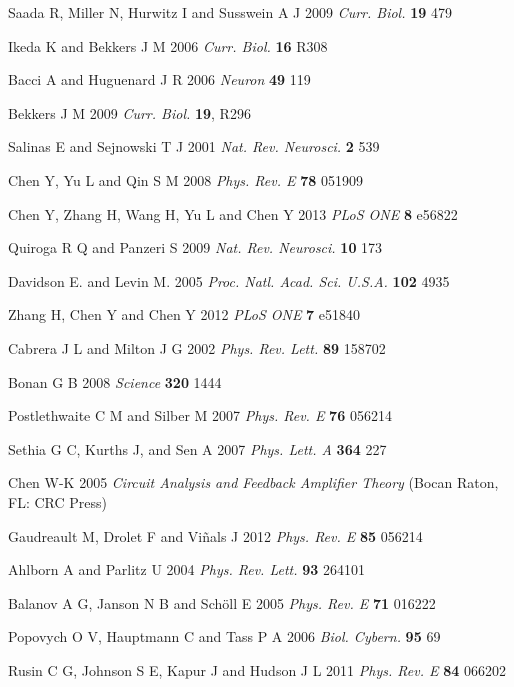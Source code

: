 \documentclass[twocolumn,showpacs,preprintnumbers,amsmath,amssymb,pre,superscriptaddress]{revtex4-1}
\begin{document}
\begin{CJK}{UTF8}{gbsn}
\begin{thebibliography}{999}
 Saada R, Miller N, Hurwitz I and Susswein A J 2009 \textit{Curr. Biol. } \textbf{19}  479 

 Ikeda K and Bekkers J M 2006 \textit{Curr. Biol. } \textbf{16} R308

 Bacci A and Huguenard J R 2006 \textit{Neuron} \textbf{49} 119

 Bekkers J M 2009 \textit{Curr. Biol.} \textbf{19}, R296

 Salinas E and Sejnowski T J 2001 \textit{Nat. Rev. Neurosci.} \textbf{2} 539

Chen Y, Yu L and Qin S M 2008 \textit{Phys. Rev. E} \textbf{78} 051909

 Chen Y, Zhang H, Wang H, Yu L and Chen Y 2013 \textit{PLoS ONE} \textbf{8} e56822

 Quiroga R  Q  and Panzeri S 2009 \textit{Nat. Rev. Neurosci.} \textbf{10} 173

 Davidson E. and Levin M. 2005 \textit{Proc. Natl. Acad. Sci. U.S.A.} \textbf{102} 4935

 Zhang H, Chen Y and Chen Y 2012 \textit{PLoS ONE} \textbf{7} e51840

 Cabrera J L and Milton J G 2002 \textit{Phys. Rev. Lett.} \textbf{89} 158702

 Bonan G B 2008 \textit{Science} \textbf{320} 1444

 Postlethwaite C M and Silber M 2007 \textit{Phys. Rev. E} \textbf{76} 056214

 Sethia G C, Kurths J, and Sen A 2007 \textit{Phys. Lett. A} \textbf{364} 227

 Chen W-K 2005 \textit{Circuit Analysis and Feedback Amplifier Theory} (Bocan Raton, FL: CRC Press)

 Gaudreault M, Drolet F and Viñals J 2012 \textit{Phys. Rev. E} \textbf{85} 056214

 Ahlborn A and Parlitz U 2004 \textit{Phys. Rev. Lett.} \textbf{93} 264101

 Balanov A G, Janson N B and Sch\"{o}ll E 2005 \textit{Phys. Rev. E} \textbf{71} 016222

 Popovych O V, Hauptmann C and Tass P A 2006 \textit{Biol. Cybern.} \textbf{95} 69


 Rusin C G, Johnson S E, Kapur J and Hudson J L 2011 \textit{Phys. Rev. E} \textbf{84} 066202



\end{thebibliography}
\end{CJK}
\end{document}

